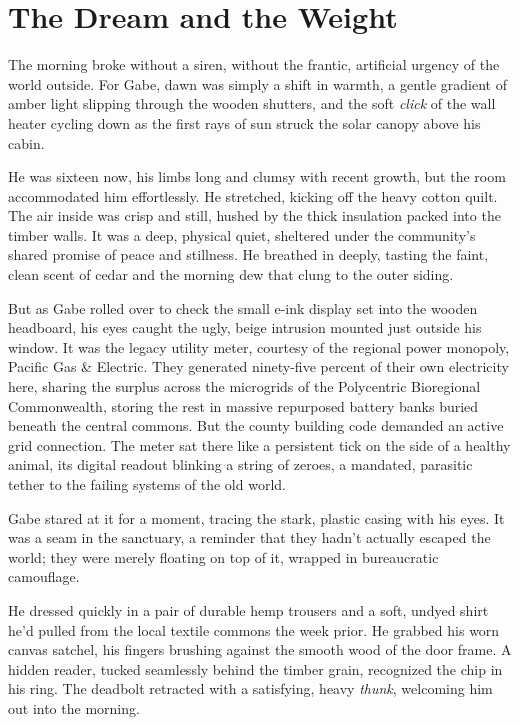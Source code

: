 \chapter{The Dream and the Weight}








The morning broke without a siren, without the frantic, artificial urgency of the world outside. For Gabe, dawn was simply a shift in warmth, a gentle gradient of amber light slipping through the wooden shutters, and the soft \textit{click} of the wall heater cycling down as the first rays of sun struck the solar canopy above his cabin. 

He was sixteen now, his limbs long and clumsy with recent growth, but the room accommodated him effortlessly. He stretched, kicking off the heavy cotton quilt. The air inside was crisp and still, hushed by the thick insulation packed into the timber walls. It was a deep, physical quiet, sheltered under the community’s shared promise of peace and stillness. He breathed in deeply, tasting the faint, clean scent of cedar and the morning dew that clung to the outer siding. 

But as Gabe rolled over to check the small e-ink display set into the wooden headboard, his eyes caught the ugly, beige intrusion mounted just outside his window. It was the legacy utility meter, courtesy of the regional power monopoly, Pacific Gas \& Electric. They generated ninety-five percent of their own electricity here, sharing the surplus across the microgrids of the Polycentric Bioregional Commonwealth, storing the rest in massive repurposed battery banks buried beneath the central commons. But the county building code demanded an active grid connection. The meter sat there like a persistent tick on the side of a healthy animal, its digital readout blinking a string of zeroes, a mandated, parasitic tether to the failing systems of the old world. 

Gabe stared at it for a moment, tracing the stark, plastic casing with his eyes. It was a seam in the sanctuary, a reminder that they hadn't actually escaped the world; they were merely floating on top of it, wrapped in bureaucratic camouflage. 

He dressed quickly in a pair of durable hemp trousers and a soft, undyed shirt he’d pulled from the local textile commons the week prior. He grabbed his worn canvas satchel, his fingers brushing against the smooth wood of the door frame. A hidden reader, tucked seamlessly behind the timber grain, recognized the chip in his ring. The deadbolt retracted with a satisfying, heavy \textit{thunk}, welcoming him out into the morning.

